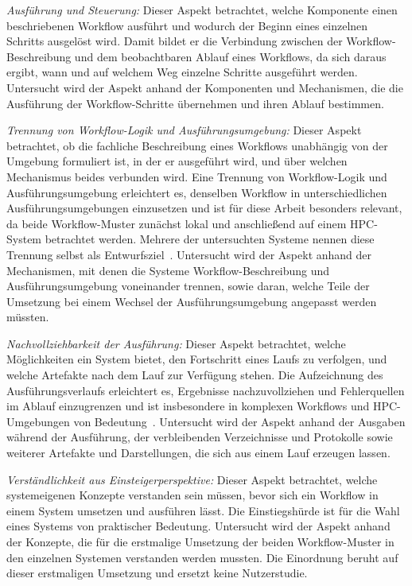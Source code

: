 \emph{Ausführung und Steuerung:} Dieser Aspekt betrachtet, welche Komponente einen beschriebenen Workflow ausführt und wodurch der Beginn eines einzelnen Schritts ausgelöst wird. Damit bildet er die Verbindung zwischen der Workflow-Beschreibung und dem beobachtbaren Ablauf eines Workflows, da sich daraus ergibt, wann und auf welchem Weg einzelne Schritte ausgeführt werden. Untersucht wird der Aspekt anhand der Komponenten und Mechanismen, die die Ausführung der Workflow-Schritte übernehmen und ihren Ablauf bestimmen.

\emph{Trennung von Workflow-Logik und Ausführungsumgebung:} Dieser Aspekt betrachtet, ob die fachliche Beschreibung eines Workflows unabhängig von der Umgebung formuliert ist, in der er ausgeführt wird, und über welchen Mechanismus beides verbunden wird. Eine Trennung von Workflow-Logik und Ausführungsumgebung erleichtert es, denselben Workflow in unterschiedlichen Ausführungsumgebungen einzusetzen und ist für diese Arbeit besonders relevant, da beide Workflow-Muster zunächst lokal und anschließend auf einem HPC-System betrachtet werden. Mehrere der untersuchten Systeme nennen diese Trennung selbst als Entwurfsziel~\cite[S.~1723]{colonnelli2021streamflow}\cite[S.~18--20]{deelman2015pegasus}. Untersucht wird der Aspekt anhand der Mechanismen, mit denen die Systeme Workflow-Beschreibung und Ausführungsumgebung voneinander trennen, sowie daran, welche Teile der Umsetzung bei einem Wechsel der Ausführungsumgebung angepasst werden müssten.

\emph{Nachvollziehbarkeit der Ausführung:} Dieser Aspekt betrachtet, welche Möglichkeiten ein System bietet, den Fortschritt eines Laufs zu verfolgen, und welche Artefakte nach dem Lauf zur Verfügung stehen. Die Aufzeichnung des Ausführungsverlaufs erleichtert es, Ergebnisse nachzuvollziehen und Fehlerquellen im Ablauf einzugrenzen und ist insbesondere in komplexen Workflows und HPC-Umgebungen von Bedeutung~\cite{davidson2008provenance,sacco2024provenance}. Untersucht wird der Aspekt anhand der Ausgaben während der Ausführung, der verbleibenden Verzeichnisse und Protokolle sowie weiterer Artefakte und Darstellungen, die sich aus einem Lauf erzeugen lassen.

\emph{Verständlichkeit aus Einsteigerperspektive:} Dieser Aspekt
betrachtet, welche systemeigenen Konzepte verstanden sein müssen,
bevor sich ein Workflow in einem System umsetzen und ausführen
lässt. Die Einstiegshürde ist für die Wahl eines Systems von
praktischer Bedeutung.  Untersucht wird der Aspekt anhand der Konzepte, die für die erstmalige Umsetzung der beiden Workflow-Muster in den einzelnen Systemen verstanden werden mussten. Die Einordnung beruht auf dieser erstmaligen Umsetzung und ersetzt keine Nutzerstudie.


